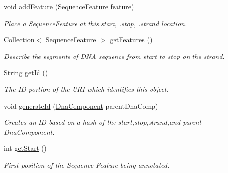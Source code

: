 \begin{DoxyCompactItemize}
\item 
void \hyperlink{classorg_1_1sbolstandard_1_1lib_s_b_o_lj_1_1_sequence_annotation_a8606f263fb4a3f3d9d7265cf1d1095d3}{addFeature} (\hyperlink{classorg_1_1sbolstandard_1_1lib_s_b_o_lj_1_1_sequence_feature}{SequenceFeature} feature)
\begin{DoxyCompactList}\small\item\em Place a \hyperlink{classorg_1_1sbolstandard_1_1lib_s_b_o_lj_1_1_sequence_feature}{SequenceFeature} at this.start, .stop, .strand location. \item\end{DoxyCompactList}\item 
Collection$<$ \hyperlink{classorg_1_1sbolstandard_1_1lib_s_b_o_lj_1_1_sequence_feature}{SequenceFeature} $>$ \hyperlink{classorg_1_1sbolstandard_1_1lib_s_b_o_lj_1_1_sequence_annotation_a6e4112a6cec45766efb5ce852f1e764e}{getFeatures} ()
\begin{DoxyCompactList}\small\item\em Describe the segments of DNA sequence from start to stop on the strand. \item\end{DoxyCompactList}\item 
String \hyperlink{classorg_1_1sbolstandard_1_1lib_s_b_o_lj_1_1_sequence_annotation_aab219518f0eaf3db55b6a62ad6b49407}{getId} ()
\begin{DoxyCompactList}\small\item\em The ID portion of the URI which identifies this object. \item\end{DoxyCompactList}\item 
void \hyperlink{classorg_1_1sbolstandard_1_1lib_s_b_o_lj_1_1_sequence_annotation_a6773fea6fb2901722a2fdf2ea2da6d70}{generateId} (\hyperlink{classorg_1_1sbolstandard_1_1lib_s_b_o_lj_1_1_dna_component}{DnaComponent} parentDnaComp)
\begin{DoxyCompactList}\small\item\em Creates an ID based on a hash of the start,stop,strand,and parent DnaCompoment. \item\end{DoxyCompactList}\item 
int \hyperlink{classorg_1_1sbolstandard_1_1lib_s_b_o_lj_1_1_sequence_annotation_a1408176a248f41dbe8735bd3009e0cf5}{getStart} ()
\begin{DoxyCompactList}\small\item\em First position of the Sequence Feature being annotated. \item\end{DoxyCompactList}\item 

\end{DoxyCompactItemize}
